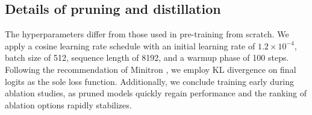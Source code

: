 \subsection{Details of pruning and distillation}\label{appendix:pd-details}
 
The hyperparameters differ from those used in pre-training from scratch. We apply a cosine learning rate schedule \citep{loshchilov2017sgdr} with an initial learning rate of $1.2 \times 10^{-4}$, batch size of 512, sequence length of 8192, and a warmup phase of 100 steps.
Following the recommendation of Minitron \citep{muralidharan2024compact, sreenivas2024llm}, we employ KL divergence \citep{Kullback1951OnIA} on final logits as the sole loss function.
Additionally, we conclude training early during ablation studies, as pruned models quickly regain performance and the ranking of ablation options rapidly stabilizes.


